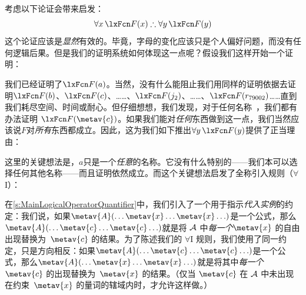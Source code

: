 考虑以下论证会带来启发：
$$\forall x\,\atom{F}{x} \therefore \forall y\,\atom{F}{y}$$
这个论证应该是\emph{显然}有效的。毕竟，字母的变化应该只是个人偏好问题，而没有任何逻辑后果。但是我们的证明系统如何体现这一点呢？假设我们这样开始一个证明：


\begin{fitchproof}
	 \PR
	 
\end{fitchproof}


我们已经证明了$\atom{F}{a}$。当然，没有什么能阻止我们用同样的证明依据去证明$\atom{F}{b}$、$\atom{F}{c}$、……、$\atom{F}{j_2}$、……、$\atom{F}{r_{79002}}$……直到我们耗尽空间、时间或耐心。但仔细想想，我们发现，对于任何名称~，我们都有办法证明 $\atom{F}{\metav{c}}$。如果我们能对\emph{任何}东西做到这一点，我们当然应该说$F$对\emph{所有}东西都成立。因此，这为我们如下推出$\forall y\,\atom{F}{y}$提供了正当理由：


\begin{fitchproof}
	\PR
	 
	 
\end{fitchproof}


这里的关键想法是，$a$只是一个\emph{任意}的名称。它没有什么特别的——我们本可以选择任何其他名称——而且证明依然成立。而这个关键想法启发了全称引入规则（$\forall$I）：

在\cref{s:MainLogicalOperatorQuantifier}中，我们引入了一个用于指示\emph{代入实例}的约定：我们说，如果$\metav{A}(\ldots \metav{x} \ldots \metav{x}\ldots)$是一个公式，那么$\metav{A}(\ldots \metav{c} \ldots \metav{c}\ldots)$就是将 $\mathcal{A}$ 中\emph{每一个}$\metav{x}$ 的自由出现替换为~$\metav{c}$ 的结果。为了陈述我们的 $\forall$I 规则，我们使用了同一约定，只是方向相反：如果$\metav{A}(\ldots \metav{c} \ldots \metav{c}\ldots)$是一个公式，那么$\metav{A}(\ldots \metav{x} \ldots \metav{x}\ldots)$就是将其中\emph{每一个}~$\metav{c}$ 的出现替换为~$\metav{x}$ 的结果。（仅当 $\metav{c}$ 在 $\mathcal{A}$ 中未出现在约束~$\metav{x}$ 的量词的辖域内时，才允许这样做。）

